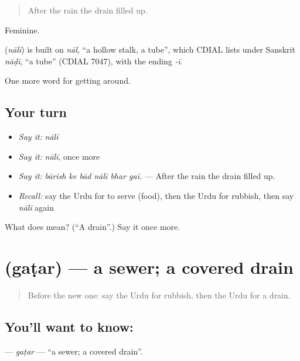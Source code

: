 \begin{quote}
After the rain the drain filled up.
\end{quote}

Feminine.

\begin{cousinweb}
\textbf{} (\emph{nālī}) is built on \emph{nāl}, \textquotedblleft{}a hollow stalk, a tube\textquotedblright{}, which CDIAL lists under Sanskrit \emph{nāḍī}, \textquotedblleft{}a tube\textquotedblright{} (CDIAL 7047), with the ending \emph{-ī}.
\end{cousinweb}

\begin{grammarlens}[title={What you've built}]
One more word for getting around.
\end{grammarlens}

\subsection*{Your turn}
\begin{itemize}
\raggedright
  \item \emph{Say it:} \emph{nālī}
  \item \emph{Say it:} \emph{nālī}, once more
  \item \emph{Say it:} \emph{bārish ke bād nālī bhar gaī.} — After the rain the drain filled up.
  \item \emph{Recall:} say the Urdu for to serve (food), then the Urdu for rubbish, then say \emph{nālī} again
\end{itemize}

\begin{tcolorbox}[breakable,colback=teal!4,colframe=teal!35!black,title={Before you move on}]
What does  mean? (\textquotedblleft{}A drain\textquotedblright{}.) Say it once more.
\end{tcolorbox}
\section[\texorpdfstring{\ur{گٹر} (gaṭar)}{گٹر (gaṭar)}]{ (gaṭar) — a sewer; a covered drain}

\label{lesson:UR-C416-gatar}



\begin{quote}
Before the new one: say the Urdu for rubbish, then the Urdu for a drain.
\end{quote}

\subsection*{You'll want to know: }
\textbf{} — \emph{gaṭar} — \textquotedblleft{}a sewer; a covered drain\textquotedblright{}.

